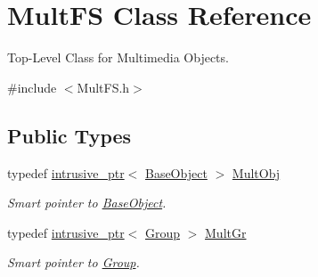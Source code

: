 \hypertarget{classMultFS}{\section{Mult\+F\+S Class Reference}
\label{classMultFS}
}


Top-\/\+Level Class for Multimedia Objects.  




{\ttfamily \#include $<$Mult\+F\+S.\+h$>$}

\subsection*{Public Types}
\begin{DoxyCompactItemize}
\item 
\hypertarget{classMultFS_a3862987abee233b7ea08a67abc80b245}{typedef \hyperlink{classintrusive__ptr}{intrusive\+\_\+ptr}$<$ \hyperlink{classBaseObject}{Base\+Object} $>$ \hyperlink{classMultFS_a3862987abee233b7ea08a67abc80b245}{Mult\+Obj}}\label{classMultFS_a3862987abee233b7ea08a67abc80b245}

\begin{DoxyCompactList}\small\item\em Smart pointer to \hyperlink{classBaseObject}{Base\+Object}. \end{DoxyCompactList}\item 
\hypertarget{classMultFS_a0c5fea8cc8ab29c2624d5863cf75cc6f}{typedef \hyperlink{classintrusive__ptr}{intrusive\+\_\+ptr}$<$ \hyperlink{classGroup}{Group} $>$ \hyperlink{classMultFS_a0c5fea8cc8ab29c2624d5863cf75cc6f}{Mult\+Gr}}\label{classMultFS_a0c5fea8cc8ab29c2624d5863cf75cc6f}

\begin{DoxyCompactList}\small\item\em Smart pointer to \hyperlink{classGroup}{Group}. \end{DoxyCompactList}\end{DoxyCompactItemize}
